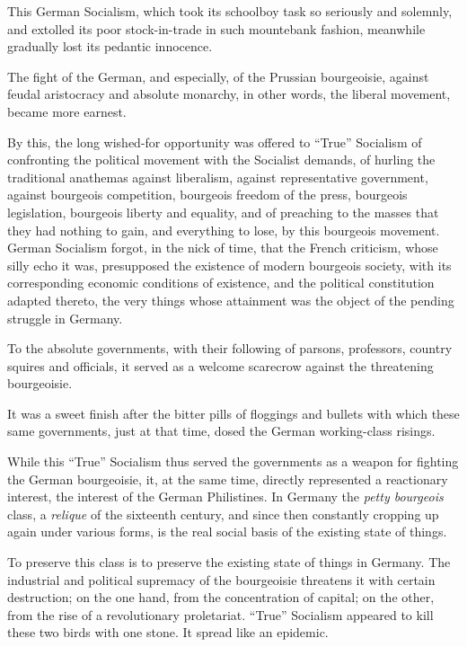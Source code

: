 This German Socialism, which took its schoolboy task so seriously and
solemnly, and extolled its poor stock-in-trade in such mountebank
fashion, meanwhile gradually lost its pedantic innocence.

The fight of the German, and especially, of the Prussian bourgeoisie,
against feudal aristocracy and absolute monarchy, in other words, the
liberal movement, became more earnest.

By this, the long wished-for opportunity was offered to \enquote{True}
Socialism of confronting the political movement with the Socialist
demands, of hurling the traditional anathemas against liberalism,
against representative government, against bourgeois competition,
bourgeois freedom of the press, bourgeois legislation, bourgeois
liberty and equality, and of preaching to the masses that they had
nothing to gain, and everything to lose, by this bourgeois movement.
German Socialism forgot, in the nick of time, that the French
criticism, whose silly echo it was, presupposed the existence of modern
bourgeois society, with its corresponding economic conditions of
existence, and the political constitution adapted thereto, the very
things whose attainment was the object of the pending struggle in
Germany.

To the absolute governments, with their following of parsons,
professors, country squires and officials, it served as a welcome
scarecrow against the threatening bourgeoisie.

It was a sweet finish after the bitter pills of floggings and bullets
with which these same governments, just at that time, dosed the German
working-class risings.

While this \enquote{True} Socialism thus served the governments as a weapon for
fighting the German bourgeoisie, it, at the same time, directly
represented a reactionary interest, the interest of the German
Philistines. In Germany the \textit{petty bourgeois} class, a \textit{relique} of the
sixteenth century, and since then constantly cropping up again under
various forms, is the real social basis of the existing state of
things.

To preserve this class is to preserve the existing state of things in
Germany. The industrial and political supremacy of the bourgeoisie
threatens it with certain destruction; on the one hand, from the
concentration of capital; on the other, from the rise of a
revolutionary proletariat. \enquote{True} Socialism appeared to kill these two
birds with one stone. It spread like an epidemic.


